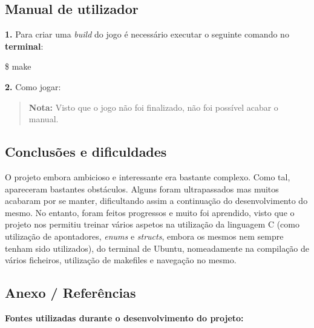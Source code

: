 \subsection*{Manual de utilizador}

{\bfseries 1.} Para criar uma {\itshape build} do jogo é necessário executar o seguinte comando no {\bfseries terminal}\+:

\$ make

{\bfseries 2.} Como jogar\+:

\begin{quote}
{\bfseries Nota\+:} Visto que o jogo não foi finalizado, não foi possível acabar o manual. \end{quote}


\subsection*{Conclusões e dificuldades}

O projeto embora ambicioso e interessante era bastante complexo. Como tal, apareceram bastantes obstáculos. Alguns foram ultrapassados mas muitos acabaram por se manter, dificultando assim a continuação do desenvolvimento do mesmo. No entanto, foram feitos progressos e muito foi aprendido, visto que o projeto nos permitiu treinar vários aspetos na utilização da linguagem C (como utilização de apontadores, {\itshape enums} e {\itshape structs}, embora os mesmos nem sempre tenham sido utilizados), do terminal de Ubuntu, nomeadamente na compilação de vários ficheiros, utilização de makefiles e navegação no mesmo.

\subsection*{Anexo / Referências}

{\bfseries Fontes utilizadas durante o desenvolvimento do projeto\+:}



